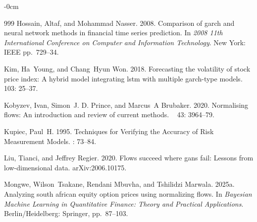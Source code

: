\documentclass[risks,article,accept,pdftex,moreauthors]{Definitions/mdpi}
\begin{document}
\begin{adjustwidth}{-\extralength}{0cm}
\begin{thebibliography}{999}
Hossain, Altaf, and Mohammad %
Nasser. 2008.
\newblock Comparison of garch and neural network methods in financial time
  series prediction.
\newblock In {\em 2008 11th International Conference on Computer and
  Information Technology}. {New York:} IEEE pp.\  729--34.

Kim, Ha~Young, and Chang~Hyun Won. 2018.
\newblock Forecasting the volatility of stock price index: A hybrid model
  integrating lstm with multiple garch-type models.
~{ 103}: 25--37.

Kobyzev, Ivan, Simon~J. D. Prince, and Marcus~A Brubaker. 2020.
\newblock Normalising flows: An introduction and review of current methods.
~{ 43\/}: 3964--79.
  
Kupiec, Paul~H. 1995. 
\newblock Techniques for Verifying the Accuracy of Risk Measurement Models. 	
: 73--84.

Liu, Tianci, and Jeffrey Regier. 2020.
\newblock Flows succeed where gans fail: Lessons from low-dimensional data.
  arXiv:2006.10175\/.

Mongwe, Wilson~Tsakane, Rendani Mbuvha, and Tshilidzi Marwala. 2025a.
\newblock Analyzing south african equity option prices using normalizing flows.
\newblock In {\em Bayesian Machine Learning in Quantitative Finance: Theory and
  Practical Applications}.  {Berlin/Heidelberg}: Springer, pp.\  87--103.


\end{thebibliography}
\end{adjustwidth}
\end{document}
